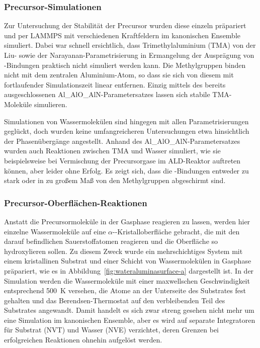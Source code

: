 \subsubsection{Precursor-Simulationen}

Zur Untersuchung der Stabilität der Precursor wurden diese einzeln präpariert und per LAMMPS mit verschiedenen Kraftfeldern im kanonischen Ensemble simuliert.
Dabei war schnell ersichtlich, dass Trimethylaluminium (TMA) von der Liu- sowie der Narayanan-Parametrisierung in Ermangelung der Ausprägung von -Bindungen praktisch nicht simuliert werden kann.
Die Methylgruppen binden nicht mit dem zentralen Aluminium-Atom, so dass sie sich von diesem mit fortlaufender Simulationszeit linear entfernen.
Einzig mittels des bereits ausgeschlossenen Al\_AlO\_AlN-Parametersatzes lassen sich stabile TMA-Moleküle simulieren.


Simulationen von Wassermolekülen sind hingegen mit allen Parametrisierungen geglückt, doch wurden keine umfangreicheren Untersuchungen etwa hinsichtlich der Phasenübergänge angestellt.
Anhand des Al\_AlO\_AlN-Parametersatzes wurden auch Reaktionen zwischen TMA und Wasser simuliert, wie sie beispielsweise bei Vermischung der Precursorgase im ALD-Reaktor auftreten können, aber leider ohne Erfolg.
Es zeigt sich, dass die -Bindungen entweder zu stark oder in zu großem Maß von den Methylgruppen abgeschirmt sind.

\subsubsection{Precursor-Oberflächen-Reaktionen}

Anstatt die Precursormoleküle in der Gasphase reagieren zu lassen, werden hier einzelne Wassermoleküle auf eine $\alpha$--Kristalloberfläche gebracht, die mit den darauf befindlichen Sauerstoffatomen reagieren und die Oberfläche so hydroxylieren sollen.
Zu diesem Zweck wurde ein mehrschichtiges System mit einem kristallinen Substrat und einer Schicht von Wassermolekülen in Gasphase präpariert, wie es in Abbildung~\ref{fig:wateraluminasurface-a} dargestellt ist.
In der Simulation werden die Wassermoleküle mit einer maxwellschen Geschwindigkeit entsprechend \SI{500}{\kelvin} versehen, die Atome an der Unterseite des Substrates fest gehalten und das Berendsen-Thermostat auf den verbleibenden Teil des Substrates angewandt.
Damit handelt es sich zwar streng gesehen nicht mehr um eine Simulation im kanonischen Ensemble, aber es wird auf separate Integratoren für Substrat (NVT) und Wasser (NVE) verzichtet, deren Grenzen bei erfolgreichen Reaktionen ohnehin aufgelöst werden.

